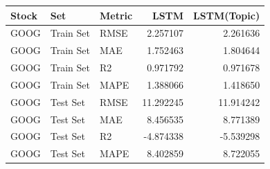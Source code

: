 \begin{tabular}{lllrr}
\toprule
Stock & Set & Metric & LSTM & LSTM(Topic) \\
\midrule
GOOG & Train Set & RMSE & 2.257107 & 2.261636 \\
GOOG & Train Set & MAE & 1.752463 & 1.804644 \\
GOOG & Train Set & R2 & 0.971792 & 0.971678 \\
GOOG & Train Set & MAPE & 1.388066 & 1.418650 \\
GOOG & Test Set & RMSE & 11.292245 & 11.914242 \\
GOOG & Test Set & MAE & 8.456535 & 8.771389 \\
GOOG & Test Set & R2 & -4.874338 & -5.539298 \\
GOOG & Test Set & MAPE & 8.402859 & 8.722055 \\
\bottomrule
\end{tabular}
